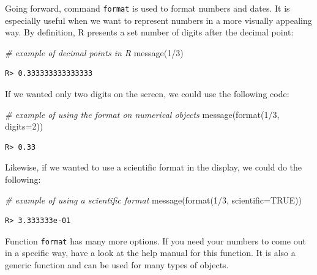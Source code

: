 \documentclass[
  12pt,
]{book}
\newenvironment{Shaded}{\begin{snugshade}}{\end{snugshade}}
\newcommand{\AttributeTok}[1]{\textcolor[rgb]{0.61,0.61,0.61}{#1}}
\newcommand{\CommentTok}[1]{\textcolor[rgb]{0.37,0.37,0.37}{\textit{#1}}}
\newcommand{\ConstantTok}[1]{\textcolor[rgb]{0,0,0}{#1}}
\newcommand{\DecValTok}[1]{\textcolor[rgb]{0.06,0.06,0.06}{#1}}
\newcommand{\FunctionTok}[1]{\textcolor[rgb]{0,0,0}{#1}}
\newcommand{\NormalTok}[1]{#1}
\newcommand{\SpecialCharTok}[1]{\textcolor[rgb]{0,0,0}{#1}}
\begin{document}
Going forward, command \texttt{format} is used to format numbers and dates. It is especially useful when we want to represent numbers in a more visually appealing way. By definition, R presents a set number of digits after the decimal point: 

\begin{Shaded}
\begin{Highlighting}[]
\CommentTok{\# example of decimal points in R}
\FunctionTok{message}\NormalTok{(}\DecValTok{1}\SpecialCharTok{/}\DecValTok{3}\NormalTok{)}
\end{Highlighting}
\end{Shaded}

\begin{verbatim}
R> 0.333333333333333
\end{verbatim}

If we wanted only two digits on the screen, we could use the following code:

\begin{Shaded}
\begin{Highlighting}[]
\CommentTok{\# example of using the format on numerical objects}
\FunctionTok{message}\NormalTok{(}\FunctionTok{format}\NormalTok{(}\DecValTok{1}\SpecialCharTok{/}\DecValTok{3}\NormalTok{, }\AttributeTok{digits=}\DecValTok{2}\NormalTok{))}
\end{Highlighting}
\end{Shaded}

\begin{verbatim}
R> 0.33
\end{verbatim}

Likewise, if we wanted to use a scientific format in the display, we could do the following:

\begin{Shaded}
\begin{Highlighting}[]
\CommentTok{\# example of using a scientific format}
\FunctionTok{message}\NormalTok{(}\FunctionTok{format}\NormalTok{(}\DecValTok{1}\SpecialCharTok{/}\DecValTok{3}\NormalTok{, }\AttributeTok{scientific=}\ConstantTok{TRUE}\NormalTok{))}
\end{Highlighting}
\end{Shaded}

\begin{verbatim}
R> 3.333333e-01
\end{verbatim}

Function \texttt{format} has many more options. If you need your numbers to come out in a specific way, have a look at the help manual for this function. It is also a generic function and can be used for many types of objects.
\end{document}
